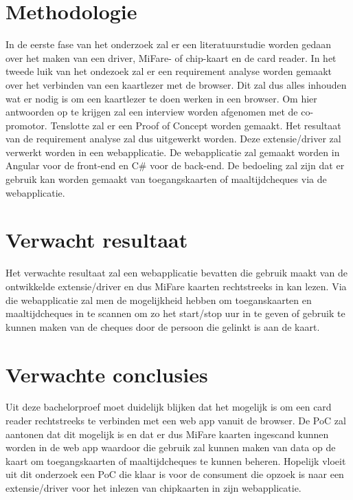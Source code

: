 \section{Methodologie}%
\label{sec:methodologie}

In de eerste fase van het onderzoek zal er een literatuurstudie worden gedaan over het maken van een driver, MiFare- of chip-kaart en de card reader. In het tweede luik van het ondezoek zal er een requirement analyse worden gemaakt over het verbinden van een kaartlezer met de browser. Dit zal dus alles inhouden wat er nodig is om een kaartlezer te doen werken in een browser. Om hier antwoorden op te krijgen zal een interview worden afgenomen met de co-promotor. Tenslotte zal er een Proof of Concept worden gemaakt. Het resultaat van de requirement analyse zal dus uitgewerkt worden. Deze extensie/driver zal verwerkt worden in een webapplicatie. De webapplicatie zal gemaakt worden in Angular voor de front-end en C\# voor de back-end. De bedoeling zal zijn dat er gebruik kan worden gemaakt van toegangskaarten of maaltijdcheques via de webapplicatie.

\section{Verwacht resultaat}%
\label{sec:verwachte_resultaten}

Het verwachte resultaat zal een webapplicatie bevatten die gebruik maakt van de ontwikkelde extensie/driver en dus MiFare kaarten rechtstreeks in kan lezen. Via die webapplicatie zal men de mogelijkheid hebben om toeganskaarten en maaltijdcheques in te scannen om zo het start/stop uur in te geven of gebruik te kunnen maken van de cheques door de persoon die gelinkt is aan de kaart.

\section{Verwachte conclusies}%
\label{sec:Verwachte_conclusies}

Uit deze bachelorproef moet duidelijk blijken dat het mogelijk is om een card reader rechtstreeks te verbinden met een web app vanuit de browser. De PoC zal aantonen dat dit mogelijk is en dat er dus MiFare kaarten ingescand kunnen worden in de web app waardoor die gebruik zal kunnen maken van data op de kaart om toegangskaarten of maaltijdcheques te kunnen beheren. Hopelijk vloeit uit dit onderzoek een PoC die klaar is voor de consument die opzoek is naar een extensie/driver voor het inlezen van chipkaarten in zijn webapplicatie.